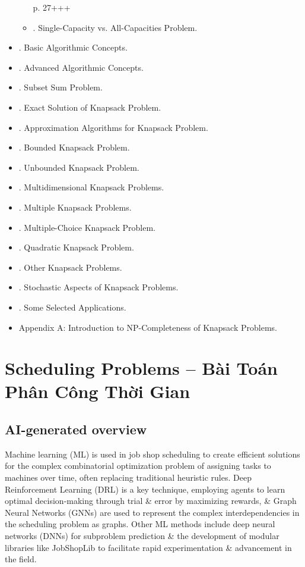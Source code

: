 \documentclass{article}
\begin{document}
\begin{itemize}
\begin{itemize}
        p. 27+++
        \item {. Single-Capacity vs. All-Capacities Problem.}
    \end{itemize}
    \item {. Basic Algorithmic Concepts.}
    \item {. Advanced Algorithmic Concepts.}
    \item {. Subset Sum Problem.}
    \item {. Exact Solution of Knapsack Problem.}
    \item {. Approximation Algorithms for Knapsack Problem.}
    \item {. Bounded Knapsack Problem.}
    \item {. Unbounded Knapsack Problem.}
    \item {. Multidimensional Knapsack Problems.}
    \item {. Multiple Knapsack Problems.}
    \item {. Multiple-Choice Knapsack Problem.}
    \item {. Quadratic Knapsack Problem.}
    \item {. Other Knapsack Problems.}
    \item {. Stochastic Aspects of Knapsack Problems.}
    \item {. Some Selected Applications.}
    \item {\sf Appendix A: Introduction to NP-Completeness of Knapsack Problems.}
\end{itemize}



\section{Scheduling Problems -- Bài Toán Phân Công Thời Gian}


\subsection{AI-generated overview}
Machine learning (ML) is used in job shop scheduling to create efficient solutions for the complex combinatorial optimization problem of assigning tasks to machines over time, often replacing traditional heuristic rules. Deep Reinforcement Learning (DRL) is a key technique, employing agents to learn optimal decision-making through trial \& error by maximizing rewards, \& Graph Neural Networks (GNNs) are used to represent the complex interdependencies in the scheduling problem as graphs. Other ML methods include deep neural networks (DNNs) for subproblem prediction \& the development of modular libraries like JobShopLib to facilitate rapid experimentation \& advancement in the field.
\end{document}
